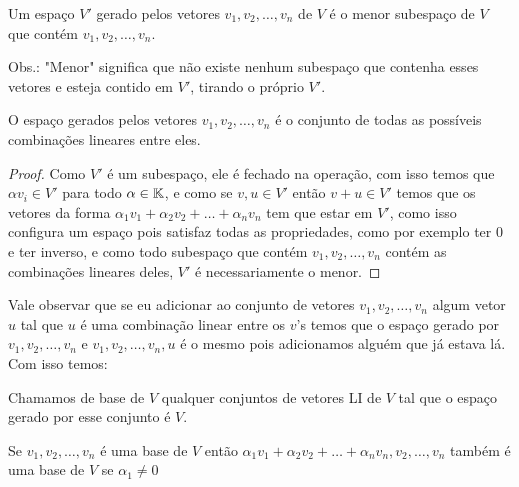 \begin{defn}
Um espaço $V'$ gerado pelos vetores $v_1,v_2,\dots,v_n$ de $V$ é o menor subespaço de $V$ que contém $v_1,v_2,\dots , v_n$.

Obs.: "Menor" significa que não existe nenhum subespaço que contenha esses vetores e  esteja contido em $V'$, tirando o próprio $V'$.
\end{defn}
    
\begin{lem}
O espaço gerados pelos vetores $v_1,v_2, \dots, v_n$ é o conjunto de todas as possíveis combinações lineares entre eles.
\end{lem}

\begin{proof}
Como $V'$ é um subespaço, ele é fechado na operação, com isso temos que $\alpha v_i \in V'$ para todo $\alpha \in \mathbb{K}$, e como se $v,u \in V'$ então $v+u \in V'$ temos que os vetores da forma $\alpha_1v_1 + \alpha_2v_2 +\dots + \alpha_nv_n$ tem que estar em $V'$, como isso configura um espaço pois satisfaz todas as propriedades, como por exemplo ter 0 e ter inverso, e como todo subespaço que contém $v_1,v_2, \dots, v_n$ contém as combinações lineares deles, $V'$ é necessariamente o menor.
\end{proof}

Vale observar que se eu adicionar ao conjunto de vetores $v_1,v_2, \dots, v_n$ algum vetor $u$ tal que $u$ é uma combinação linear entre os $v$'s temos que o espaço gerado por $v_1,v_2, \dots, v_n$ e $v_1,v_2, \dots, v_n, u$ é o mesmo pois adicionamos alguém que já estava lá. Com isso temos:

\begin{defn}
Chamamos de base de $V$ qualquer conjuntos de vetores LI de $V$ tal que o espaço gerado por esse conjunto é $V$.
\end{defn}

\begin{lem}
\label{Lema1.3}
Se $v_1,v_2,\dots,v_n$ é uma base de $V$ então $\alpha_1v_1 + \alpha_2v_2 +\dots + \alpha_nv_n, v_2,\dots,v_n $ também é uma base de $V$ se $\alpha_1 \ne 0$
\end{lem}

